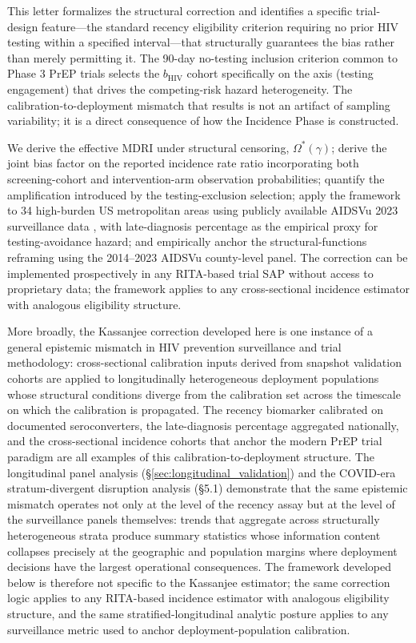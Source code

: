 \documentclass[12pt]{article}
\begin{document}
This letter formalizes the structural correction and identifies a specific trial-design feature---the standard recency eligibility criterion requiring no prior HIV testing within a specified interval---that structurally guarantees the bias rather than merely permitting it. The 90-day no-testing inclusion criterion common to Phase 3 PrEP trials selects the $b_{\mathrm{HIV}}$ cohort specifically on the axis (testing engagement) that drives the competing-risk hazard heterogeneity. The calibration-to-deployment mismatch that results is not an artifact of sampling variability; it is a direct consequence of how the Incidence Phase is constructed.

We derive the effective MDRI under structural censoring, $\Omega^*(\gamma)$; derive the joint bias factor on the reported incidence rate ratio incorporating both screening-cohort and intervention-arm observation probabilities; quantify the amplification introduced by the testing-exclusion selection; apply the framework to 34 high-burden US metropolitan areas using publicly available AIDSVu 2023 surveillance data \cite{aidsvu2023}, with late-diagnosis percentage as the empirical proxy for testing-avoidance hazard; and empirically anchor the structural-functions reframing using the 2014--2023 AIDSVu county-level panel. The correction can be implemented prospectively in any RITA-based trial SAP without access to proprietary data; the framework applies to any cross-sectional incidence estimator with analogous eligibility structure.

More broadly, the Kassanjee correction developed here is one instance of a general epistemic mismatch in HIV prevention surveillance and trial methodology: cross-sectional calibration inputs derived from snapshot validation cohorts are applied to longitudinally heterogeneous deployment populations whose structural conditions diverge from the calibration set across the timescale on which the calibration is propagated. The recency biomarker calibrated on documented seroconverters, the late-diagnosis percentage aggregated nationally, and the cross-sectional incidence cohorts that anchor the modern PrEP trial paradigm are all examples of this calibration-to-deployment structure. The longitudinal panel analysis (§\ref{sec:longitudinal_validation}) and the COVID-era stratum-divergent disruption analysis (§5.1) demonstrate that the same epistemic mismatch operates not only at the level of the recency assay but at the level of the surveillance panels themselves: trends that aggregate across structurally heterogeneous strata produce summary statistics whose information content collapses precisely at the geographic and population margins where deployment decisions have the largest operational consequences. The framework developed below is therefore not specific to the Kassanjee estimator; the same correction logic applies to any RITA-based incidence estimator with analogous eligibility structure, and the same stratified-longitudinal analytic posture applies to any surveillance metric used to anchor deployment-population calibration.
\end{document}
